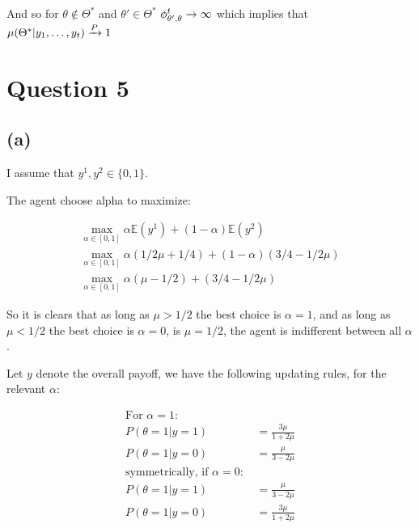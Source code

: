 \documentclass{article}
\begin{document}
And so for $\theta \not\in \Theta^*$ and $\theta' \in \Theta^*$
$\phi_{\theta', \theta}^t \to \infty$ which implies that $\mu(\Theta^* | y_1, \ldots, y_t) \xrightarrow{P} 1$ 


\section{Question 5}%
\label{sec:Question 5}

\subsection{(a)} %

I assume that $y^1, y^2 \in \{0, 1\}$.

The agent choose alpha to maximize:

\begin{equation}
\begin{split}
  \max_{\alpha \in [0,1]} \alpha\mathbb{E}(y^1) + (1 - \alpha)\mathbb{E}(y^2) \\
  \max_{\alpha \in [0,1]} \alpha(1/2\mu + 1/4) + (1 - \alpha)(3/4 - 1/2\mu) \\
  \max_{\alpha \in [0,1]} \alpha(\mu - 1/2) + (3/4 - 1/2\mu)
\end{split}
\end{equation}

So it is clears that as long as $\mu > 1/2$ the best choice is $\alpha = 1$,
and as long as $\mu < 1/2$ the best choice is $\alpha = 0$, is $\mu = 1/2$,
the agent is indifferent between all $\alpha$.

Let $y$ denote the overall payoff, we have the following updating rules,
for the relevant $\alpha$:

\begin{equation}
\begin{split}
  \text{For $\alpha = 1$:} \\
  P(\theta = 1|y = 1)   & = \frac{3\mu}{1 + 2\mu} \\
  P(\theta = 1|y = 0)   & = \frac{\mu}{3 - 2\mu} \\
  \text{symmetrically, if $\alpha = 0$: } & \\
  P(\theta = 1|y = 1)   & = \frac{\mu}{3 - 2\mu} \\
  P(\theta = 1|y = 0)   & = \frac{3\mu}{1 + 2\mu}
\end{split}
\end{equation}
\end{document}
